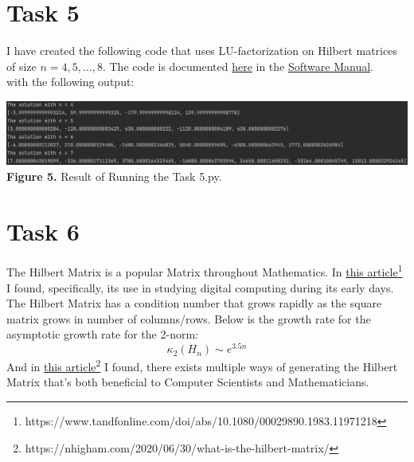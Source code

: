 \documentclass{article}
\begin{document}
\section*{Task 5}
I have created the following code that uses LU-factorization on Hilbert matrices of size $n = 4, 5, \dots, 8$. The code is documented \href{https://github.com/GoByMark/math4610/blob/main/Homework_Tasks/Tasksheet_08/src/Task_5.py}{here} in the \href{https://github.com/GoByMark/math4610/blob/main/Homework_Tasks/Software_Manual/Software_Manual_toc.md}{Software Manual}.\\

with the following output:
\begin{center}
\includegraphics[width=\textwidth]{Screenshots/5.png}\\
{\bf Figure 5.} Result of Running the Task 5.py.
\end{center}


\section*{Task 6}
The Hilbert Matrix is a popular Matrix throughout Mathematics. In \href{https://www.tandfonline.com/doi/abs/10.1080/00029890.1983.11971218}{this article}\footnote{https://www.tandfonline.com/doi/abs/10.1080/00029890.1983.11971218} I found, specifically, its use in studying digital computing during its early days. The Hilbert Matrix has a condition number that grows rapidly as the square matrix grows in number of columns/rows. Below is the growth rate for the asymptotic growth rate for the 2-norm:
$$\kappa_2\left(H_n\right) \sim e^{3.5n}$$
And in \href{https://nhigham.com/2020/06/30/what-is-the-hilbert-matrix/}{this article}\footnote{https://nhigham.com/2020/06/30/what-is-the-hilbert-matrix/} I found, there exists multiple ways of generating the Hilbert Matrix that's both beneficial to Computer Scientists and Mathematicians.
\end{document}

